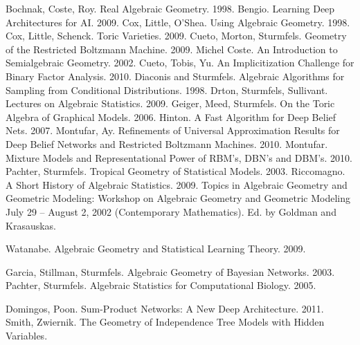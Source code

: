 \documentclass[12pt]{article}
\begin{document}
\begin{thebibliography}{100}
     Bochnak, Coste, Roy.  Real Algebraic Geometry.  1998.
     Bengio.  Learning Deep Architectures for AI. 2009.
     Cox, Little, O'Shea.  Using Algebraic Geometry.  1998.
     Cox, Little, Schenck.  Toric Varieties.  2009.
     Cueto, Morton, Sturmfels. Geometry of the Restricted Boltzmann Machine.  2009.
     Michel Coste.  An Introduction to Semialgebraic Geometry.  2002.
     Cueto, Tobis, Yu.  An Implicitization Challenge for Binary Factor Analysis. 
    2010.
     Diaconis and Sturmfels.  Algebraic Algorithms for Sampling
    from Conditional Distributions. 1998.
     Drton, Sturmfels, Sullivant. Lectures on Algebraic
    Statistics. 2009.
     Geiger, Meed, Sturmfels.  On the Toric Algebra of Graphical Models. 2006.
     Hinton.  A Fast Algorithm for Deep Belief Nets.  2007.
     Montufar, Ay.  Refinements of Universal Approximation
    Results for Deep Belief Networks and Restricted Boltzmann Machines.  2010.
     Montufar.  Mixture Models and Representational Power of
    RBM's, DBN's and DBM's.  2010.
     Pachter, Sturmfels.  Tropical Geometry of Statistical Models. 2003.
     Riccomagno.  A Short History of Algebraic Statistics.  2009.
     Topics in Algebraic Geometry and Geometric Modeling:
    Workshop on Algebraic Geometry and Geometric Modeling July 29 -- August 2,
    2002 (Contemporary Mathematics).  Ed. by Goldman and Krasauskas.

     Watanabe.  Algebraic Geometry and Statistical Learning Theory.  2009.

     Garcia, Stillman, Sturmfels.  Algebraic Geometry of Bayesian Networks.  2003.
     Pachter, Sturmfels.  Algebraic Statistics for Computational Biology.  2005.

     Domingos, Poon. Sum-Product Networks: A New Deep Architecture. 2011.
     Smith, Zwiernik.  The Geometry of Independence Tree Models with Hidden Variables.
\end{thebibliography}
\end{document}
